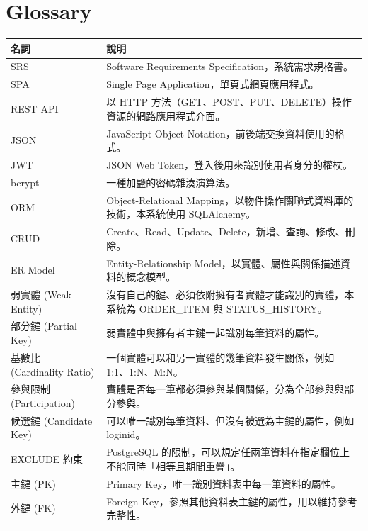 \documentclass[12pt,a4paper]{article}
\begin{document}
\endgroup




\clearpage
\section*{Glossary}

\begin{xltabular}{\linewidth}{|>{\centering\arraybackslash}p{3.4cm}|X|}
\hline{}\textbf{名詞} & \textbf{說明}\\\hline\endhead
SRS & Software Requirements Specification，系統需求規格書。\\\hline
SPA & Single Page Application，單頁式網頁應用程式。\\\hline
REST API & 以 HTTP 方法（GET、POST、PUT、DELETE）操作資源的網路應用程式介面。\\\hline
JSON & JavaScript Object Notation，前後端交換資料使用的格式。\\\hline
JWT & JSON Web Token，登入後用來識別使用者身分的權杖。\\\hline
bcrypt & 一種加鹽的密碼雜湊演算法。\\\hline
ORM & Object-Relational Mapping，以物件操作關聯式資料庫的技術，本系統使用 SQLAlchemy。\\\hline
CRUD & Create、Read、Update、Delete，新增、查詢、修改、刪除。\\\hline
ER Model & Entity-Relationship Model，以實體、屬性與關係描述資料的概念模型。\\\hline
弱實體 (Weak Entity) & 沒有自己的鍵、必須依附擁有者實體才能識別的實體，本系統為 ORDER\_ITEM 與 STATUS\_HISTORY。\\\hline
部分鍵 (Partial Key) & 弱實體中與擁有者主鍵一起識別每筆資料的屬性。\\\hline
基數比 (Cardinality Ratio) & 一個實體可以和另一實體的幾筆資料發生關係，例如 1:1、1:N、M:N。\\\hline
參與限制 (Participation) & 實體是否每一筆都必須參與某個關係，分為全部參與與部分參與。\\\hline
候選鍵 (Candidate Key) & 可以唯一識別每筆資料、但沒有被選為主鍵的屬性，例如 loginid。\\\hline
EXCLUDE 約束 & PostgreSQL 的限制，可以規定任兩筆資料在指定欄位上不能同時「相等且期間重疊」。\\\hline
主鍵 (PK) & Primary Key，唯一識別資料表中每一筆資料的屬性。\\\hline
外鍵 (FK) & Foreign Key，參照其他資料表主鍵的屬性，用以維持參考完整性。\\\hline

\end{xltabular}
\end{document}
